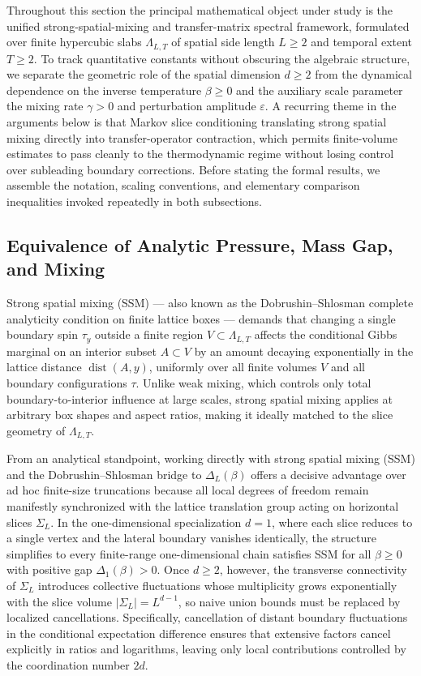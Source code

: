 \documentclass[11pt]{article}
\theoremstyle{definition}
\begin{document}
Throughout this section the principal mathematical object under study is the unified
strong-spatial-mixing and transfer-matrix spectral framework, formulated over finite
hypercubic slabs $\Lambda_{L,T}$ of spatial side length $L \ge 2$ and temporal
extent $T \ge 2$. To track quantitative constants without obscuring the algebraic
structure, we separate the geometric role of the spatial dimension $d \ge 2$ from
the dynamical dependence on the inverse temperature $\beta \ge 0$ and the auxiliary
scale parameter the mixing rate $\gamma > 0$ and perturbation amplitude
$\varepsilon$. A recurring theme in the arguments below is that Markov slice
conditioning translating strong spatial mixing directly into transfer-operator
contraction, which permits finite-volume estimates to pass cleanly to the
thermodynamic regime without losing control over subleading boundary corrections.
Before stating the formal results, we assemble the notation, scaling conventions,
and elementary comparison inequalities invoked repeatedly in both subsections.

\subsection{Equivalence of Analytic Pressure, Mass Gap, and Mixing}
\label{subsec:s10a}

Strong spatial mixing (SSM) --- also known as the Dobrushin--Shlosman complete
analyticity condition on finite lattice boxes --- demands that changing a single
boundary spin $\tau_y$ outside a finite region $V \subset \Lambda_{L,T}$ affects the
conditional Gibbs marginal on an interior subset $A \subset V$ by an amount decaying
exponentially in the lattice distance $\operatorname{dist}(A, y)$, uniformly over
all finite volumes $V$ and all boundary configurations $\tau$. Unlike weak mixing,
which controls only total boundary-to-interior influence at large scales, strong
spatial mixing applies at arbitrary box shapes and aspect ratios, making it ideally
matched to the slice geometry of $\Lambda_{L,T}$.

From an analytical standpoint, working directly with strong spatial mixing (SSM) and
the Dobrushin--Shlosman bridge to $\Delta_L(\beta)$ offers a decisive advantage over
ad hoc finite-size truncations because all local degrees of freedom remain
manifestly synchronized with the lattice translation group acting on horizontal
slices $\Sigma_L$. In the one-dimensional specialization $d = 1$, where each slice
reduces to a single vertex and the lateral boundary vanishes identically, the
structure simplifies to every finite-range one-dimensional chain satisfies SSM for
all $\beta \ge 0$ with positive gap $\Delta_1(\beta) > 0$. Once $d \ge 2$, however,
the transverse connectivity of $\Sigma_L$ introduces collective fluctuations whose
multiplicity grows exponentially with the slice volume $|\Sigma_L| = L^{d-1}$, so
naive union bounds must be replaced by localized cancellations. Specifically,
cancellation of distant boundary fluctuations in the conditional expectation
difference ensures that extensive factors cancel explicitly in ratios and
logarithms, leaving only local contributions controlled by the coordination number
$2d$.
\end{document}
